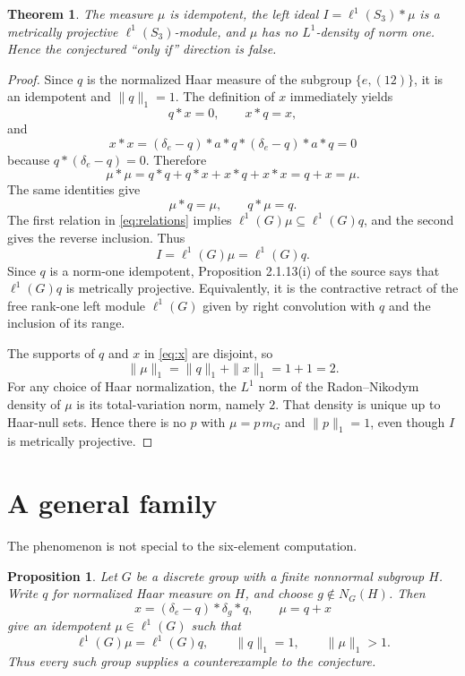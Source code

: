 \documentclass[11pt]{article}
\newtheorem{theorem}{Theorem}
\newtheorem{proposition}{Proposition}
\newcommand{\de}{\delta_e}
\begin{document}
\begin{theorem}\label{thm:counterexample}
The measure $\mu$ is idempotent, the left ideal
$I=\ell^1(S_3)*\mu$ is a metrically projective $\ell^1(S_3)$-module, and
$\mu$ has no $L^1$-density of norm one.  Hence the conjectured ``only if''
direction is false.
\end{theorem}

\begin{proof}
Since $q$ is the normalized Haar measure of the subgroup
$\{e,(12)\}$, it is an idempotent and $\|q\|_1=1$.  The definition of $x$
immediately yields
\[
 q*x=0,\qquad x*q=x,
\]
and
\[
 x*x=(\de-q)*a*q*(\de-q)*a*q=0
\]
because $q*(\de-q)=0$.  Therefore
\[
 \mu*\mu=q*q+q*x+x*q+x*x=q+x=\mu.
\]
The same identities give
\begin{equation}\label{eq:relations}
 \mu*q=\mu,\qquad q*\mu=q.
\end{equation}
The first relation in \eqref{eq:relations} implies
$\ell^1(G)\mu\subseteq\ell^1(G)q$, and the second gives the reverse
inclusion.  Thus
\[
 I=\ell^1(G)\mu=\ell^1(G)q.
\]
Since $q$ is a norm-one idempotent, Proposition 2.1.13(i) of the source says
that $\ell^1(G)q$ is metrically projective.  Equivalently, it is the
contractive retract of the free rank-one left module $\ell^1(G)$ given by
right convolution with $q$ and the inclusion of its range.

The supports of $q$ and $x$ in \eqref{eq:x} are disjoint, so
\[
 \|\mu\|_1=\|q\|_1+\|x\|_1=1+1=2.
\]
For any choice of Haar normalization, the $L^1$ norm of the Radon--Nikodym
density of $\mu$ is its total-variation norm, namely $2$.  That density is
unique up to Haar-null sets.  Hence there is no $p$ with
$\mu=p\,m_G$ and $\|p\|_1=1$, even though $I$ is metrically projective.
\end{proof}

\section*{A general family}
The phenomenon is not special to the six-element computation.

\begin{proposition}\label{prop:family}
Let $G$ be a discrete group with a finite nonnormal subgroup $H$.  Write $q$
for normalized Haar measure on $H$, and choose
$g\notin N_G(H)$.  Then
\[
 x=(\de-q)*\delta_g*q,\qquad \mu=q+x
\]
give an idempotent $\mu\in\ell^1(G)$ such that
\[
 \ell^1(G)\mu=\ell^1(G)q,\qquad \|q\|_1=1,\qquad \|\mu\|_1>1.
\]
Thus every such group supplies a counterexample to the conjecture.
\end{proposition}
\end{document}
